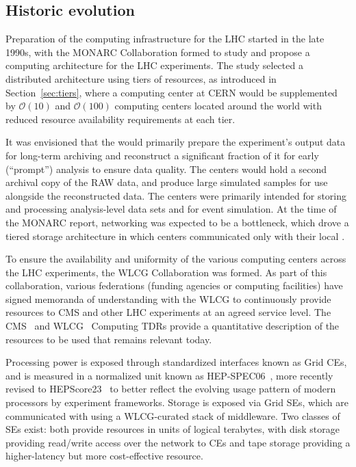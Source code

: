 \subsection{Historic evolution}
\label{sec:Infrastrucrure:Introduction}

Preparation of the computing infrastructure for the LHC started in the late 1990s, with the \gls{MONARC} Collaboration formed to study and propose a computing architecture for the LHC experiments. The study selected a distributed architecture using tiers of resources, as introduced in Section~\ref{sec:tiers}, where a \TierZero computing center at CERN would be supplemented by $\mathcal{O}(10)$ \TierOne and $\mathcal{O}(100)$ \TierTwo computing centers located around the world with reduced resource availability requirements at each tier. 

It was envisioned that the \TierZero would primarily prepare the experiment’s output data for long-term archiving and reconstruct a significant fraction of it for early (``prompt'') analysis to ensure data quality. The \TierOne centers would hold a second archival copy of the \gls{RAW} data, and produce large simulated samples for use alongside the reconstructed data. The \TierTwo centers were primarily intended for storing and processing analysis-level data sets and for event simulation. At the time of the \gls{MONARC} report, networking was expected to be a bottleneck, which drove a tiered storage architecture in which \TierTwo centers communicated only with their local \TierOne.

To ensure the availability and uniformity of the various computing centers across the LHC experiments, the \gls{WLCG} Collaboration was formed. As part of this collaboration, various federations (funding agencies or computing facilities) have signed memoranda of understanding with the \gls{WLCG} to continuously provide resources to CMS and other LHC experiments at an agreed service level. The CMS~\cite{CMS:2005aa} and \gls{WLCG}~\cite{Bird:2005js} Computing TDRs provide a quantitative description of the resources to be used that remains relevant today. 

Processing power is exposed through standardized interfaces known as Grid \glspl{CE}, and is measured in a normalized unit known as \gls{HEP}-SPEC06~\cite{fpix,HS06}, more recently revised to HEPScore23~\cite{Giordano:2023vnv} to better reflect the evolving usage pattern of modern processors by experiment frameworks. Storage is exposed via Grid \glspl{SE}, which are communicated with using a \gls{WLCG}-curated stack of middleware. Two classes of \glspl{SE} exist: both provide resources in units of logical terabytes, with disk storage providing read/write access over the network to \glspl{CE} and tape storage providing a higher-latency but more cost-effective resource.

